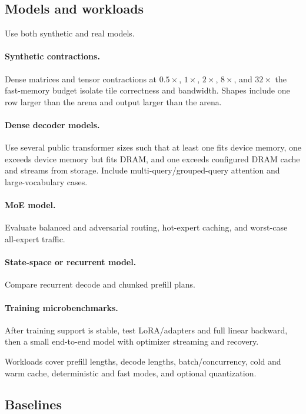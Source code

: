 \subsection{Models and workloads}

Use both synthetic and real models.

\paragraph{Synthetic contractions.}
Dense matrices and tensor contractions at $0.5\times$, $1\times$, $2\times$, $8\times$, and $32\times$ the fast-memory budget isolate tile correctness and bandwidth. Shapes include one row larger than the arena and output larger than the arena.

\paragraph{Dense decoder models.}
Use several public transformer sizes such that at least one fits device memory, one exceeds device memory but fits DRAM, and one exceeds configured DRAM cache and streams from storage. Include multi-query/grouped-query attention and large-vocabulary cases.

\paragraph{MoE model.}
Evaluate balanced and adversarial routing, hot-expert caching, and worst-case all-expert traffic.

\paragraph{State-space or recurrent model.}
Compare recurrent decode and chunked prefill plans.

\paragraph{Training microbenchmarks.}
After training support is stable, test LoRA/adapters and full linear backward, then a small end-to-end model with optimizer streaming and recovery.

Workloads cover prefill lengths, decode lengths, batch/concurrency, cold and warm cache, deterministic and fast modes, and optional quantization.

\subsection{Baselines}

